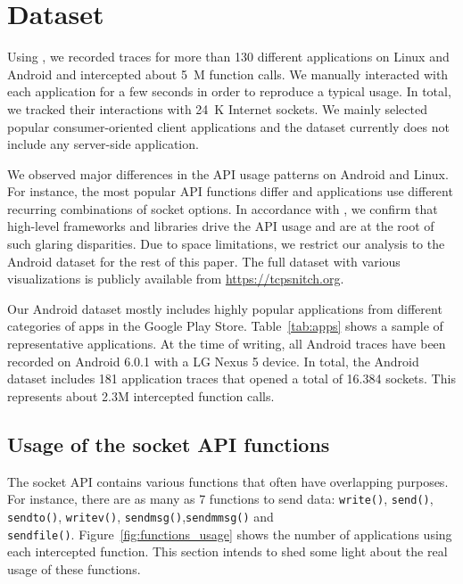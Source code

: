 \section{Dataset}\label{sec:dataset}

Using \tcpsnitchns, we recorded traces for more than 130 different applications
on Linux and Android and intercepted about 5~M function calls. We manually
interacted with each application for a few seconds in order to reproduce a
typical usage. In total, we tracked their interactions with 24~K Internet
sockets. We mainly selected popular consumer-oriented client applications and
the dataset currently does not include any server-side application.

We observed major differences in the API usage patterns on Android and Linux.
For instance, the most popular API functions differ and applications use
different recurring combinations of socket options. In accordance with
\cite{Atlidakis:POSIX}, we confirm that high-level frameworks and libraries
drive the API usage and are at the root of such glaring disparities. Due to
space limitations, we restrict our analysis to the Android dataset for the rest
of this paper. The full dataset with various visualizations is publicly
available from \url{https://tcpsnitch.org}.

Our Android dataset mostly includes highly popular applications from different
categories of apps in the Google Play Store. Table~\ref{tab:apps} shows a
sample of representative applications. At the time of writing, all Android
traces have been recorded on Android 6.0.1 with a LG Nexus 5 device.  In total,
the Android dataset includes 181 application traces that opened a total of
16.384 sockets. This represents about 2.3M intercepted function calls.

\subsection{Usage of the socket API functions}

The socket API contains various functions that often have overlapping purposes.
For instance, there are as many as 7 functions to send data: \texttt{write()},
\texttt{send()}, \texttt{sendto()}, \texttt{writev()},
\texttt{sendmsg()},\texttt{sendmmsg()} and\\\texttt{sendfile()}.
Figure~\ref{fig:functions_usage} shows the number of applications using each
intercepted function. This section intends to shed some light about the real
usage of these functions.

